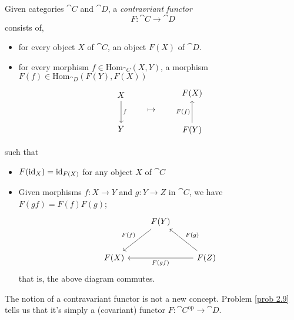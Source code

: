 \begin{definition}
Given categories $\cat{C}$ and $\cat{D}$, a \emph{contravriant functor}
\[F:\cat{C} \to \cat{D}\]
consists of,
\begin{itemize}
\item for every object $X$ of $\cat{C}$, an object $F(X)$ of $\cat{D}$.
\item for every morphism $f \in \mathrm{Hom}_{\cat{C}}(X,Y)$, a morphism $F(f) \in \mathrm{Hom}_{\cat{D}}(F(Y),F(X))$
\[\begin{tikzcd}[row sep=large]
X \arrow[d,"f"] \\
Y          
\end{tikzcd}\qquad \mapsto \qquad \begin{tikzcd}[row sep=large]
F(X) \\
F(Y) \arrow[u,"F(f)"]          
\end{tikzcd}\]
\end{itemize}
such that
\begin{itemize}
\item $F(\operatorname{id}_X) = \operatorname{id}_{F(X)}$ for any object $X$ of $\cat{C}$
\item Given morphisms $f:X \to Y$ and $g: Y \to Z$ in $\cat{C}$, we have $F(gf) = F(f)F(g)$;
\[\begin{tikzcd}[row sep=large]
                                             & F(Y)  \arrow[ld, "F(f)"'] &      \\
F(X) &                         & F(Z) \arrow[ll, "F(gf)"] \arrow[lu, "F(g)"']
\end{tikzcd}\]
that is, the above diagram commutes.
\end{itemize}
\end{definition}

\vspace*{0.1in}

\begin{remark}
The notion of a contravariant functor is not a new concept. Problem \ref{prob 2.9} tells us that it's simply a (covariant) functor $F:\cat{C}^{\text{op}} \to \cat{D}$.
\end{remark}

\vspace*{0.1in}

